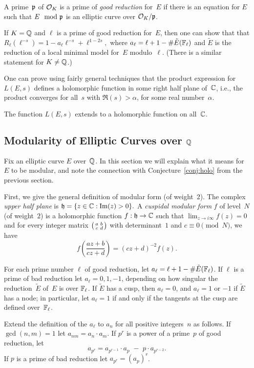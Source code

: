 A prime~$\mathfrak{p}$ of $\mathcal{O}_K$ is a prime of {\em good reduction} for~$E$ if
there is an equation for $E$ such that $E \mod {\mathfrak{p}}$ is an elliptic
curve over $\mathcal{O}_K/\mathfrak{p}$.

If $K=\mathbb{Q}$ and $\ell$ is a prime of good reduction for~$E$, then
one can show that that
$R_{\ell}(\ell^{-s}) = 1 - a_\ell \ell^{-s} + \ell^{1-2s},$
where
$
  a_{\ell} = \ell + 1 - \#\tilde{E}(\mathbb{F}_\ell)
$
and $\tilde{E}$ is the reduction of a local minimal
model for~$E$ modulo~$\ell$.  (There is a similar statement
for $K\neq \mathbb{Q}$.)

One can prove using fairly general techniques that the product
expression for $L(E,s)$ defines a holomorphic function in some right
half plane of~$\mathbb{C}$, i.e., the product converges for all~$s$ with
$\Re(s)>\alpha$, for some real number~$\alpha$.
\begin{conjecture}\label{conj:holo}
The function $L(E,s)$ extends to a holomorphic
function on all~$\mathbb{C}$.
\end{conjecture}

\subsection{Modularity of Elliptic Curves over $\mathbb{Q}$}
Fix an elliptic curve $E$ over~$\mathbb{Q}$.  In this section we will explain
what it means for $E$ to be modular, and note the connection with
Conjecture~\ref{conj:holo} from the previous section.

First, we give the general definition of modular form (of weight~$2$).
The complex {\em upper half plane} is
$
  \mathfrak{h}  = \{z  \in \mathbb{C} : \text{Im}(z) > 0\}.
$
A {\em cuspidal modular form} $f$ of level~$N$ (of weight~$2$) is a holomorphic
function
$
   f : \mathfrak{h} \to \mathbb{C}
$
such that $\lim_{z\to i\infty} f(z) = 0$ and for every integer matrix
$\left( \begin{smallmatrix}a&b\\c&d\end{smallmatrix}\right)$ with determinant~$1$ and $c\equiv 0 \pmod{N}$, we have
$$
  f\left( \frac{az + b}{cz + d} \right)
         = (cz+d)^{-2} f(z).
$$

For each prime number $\ell$ of good reduction, let $a_\ell = \ell+1 -
\#\tilde{E}(\mathbb{F}_{\ell})$.  If $\ell$ is a prime of bad reduction let
$a_\ell = 0,1,-1$, depending on how singular the reduction~$\tilde{E}$
of~$E$ is over $\mathbb{F}_{\ell}$.  If $\tilde{E}$ has a cusp, then $a_\ell=0$,
and $a_\ell=1$ or $-1$ if $\tilde{E}$ has a node; in particular,
let $a_\ell=1$ if
and only if the tangents at the cusp are defined over~$\mathbb{F}_{\ell}$.

Extend the definition of the $a_\ell$ to $a_n$ for all positive
integers~$n$ as follows.  If $\gcd(n,m)=1$ let $a_{nm} = a_n \cdot
a_m$.  If $p^r$ is a power of a prime~$p$ of good reduction, let
$$
 a_{p^r} = a_{p^{r-1}}\cdot a_p \,\,-\,\, p \cdot a_{p^{r-2}}.
$$
If $p$ is a prime of bad reduction let $a_{p^r} = (a_p)^r$.

